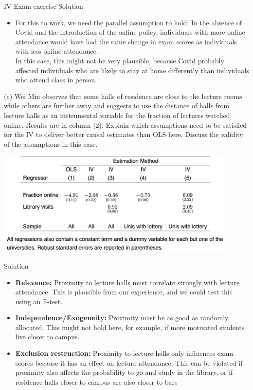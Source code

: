 \documentclass[11pt,xcolor=table]{beamer}
\begin{document}
\begin{frame}[allowframebreaks]{IV Exam exercise}
\alert{Solution}
\begin{itemize}
    \item For this to work, we need the parallel assumption to hold: In the absence of Covid and the introduction of the online policy, individuals with more online attendance would have had the same change in exam scores as individuals with less online attendance. \\ 
    In this case, this might not be very plausible, because Covid probably affected individuals who are likely to stay at home differently than individuals who attend class in person.

\end{itemize}
\framebreak



\framebreak 
\small{
(c) Wei Min observes that some halls of residence are close to the lecture rooms while others are further away and suggests to use the distance of halls from lecture halls as an instrumental variable for the fraction of lectures watched online. Results are in column (2). Explain which assumptions need to be satisfied for the IV to deliver better causal estimates than OLS here. Discuss the validity of the assumptions in this case.}


\framebreak 
\includegraphics[width=0.9\textwidth]{tables/IV_Table.png}
\framebreak



\alert{Solution}
    \begin{itemize}
    \item \textbf{Relevance:} Proximity to lecture halls must correlate strongly with lecture attendance. This is plausible from our experience, and we could test this using an F-test.
    \item  
    \textbf{Independence/Exogeneity:}  Proximity must be as good as randomly allocated. This might not hold here, for example, if more motivated students live closer to campus.
    \item
    \textbf{Exclusion restruction:} Proximity to lecture halls only influences exam scores because it has an effect on lecture attendance. This can be violated if proximity also affects the probability to go and study in the library, or if residence halls closer to campus are also closer to bars
\end{itemize}


\end{frame}
\end{document}
